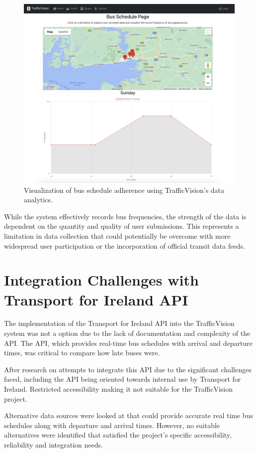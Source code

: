 \begin{figure}[H]
    \centering
    \includegraphics[width=\linewidth]{images/busUI.png}
    \caption{Visualization of bus schedule adherence using TrafficVision's data analytics.}
    \label{fig:busUI}
\end{figure}

While the system effectively records bus frequencies, the strength of the data is dependent on the quantity and quality of user submissions. This represents a limitation in data collection that could potentially be overcome with more widespread user participation or the incorporation of official transit data feeds.

\section{Integration Challenges with Transport for Ireland API}
The implementation of the Transport for Ireland API into the TrafficVision system was not a option due to the lack of documentation and complexity of the API. The API, which provides real-time bus schedules with arrival and departure times, was critical to compare how late buses were.

After research on attempts to integrate this API due to the significant challenges faced, including the API being oriented towards internal use by Transport for Ireland. Restricted accessibility making it not suitable for the TrafficVision project.

Alternative data sources were looked at that could provide accurate real time bus schedules along with departure and arrival times. However, no suitable alternatives were identified that satisfied the project's specific accessibility, reliability and integration needs.

